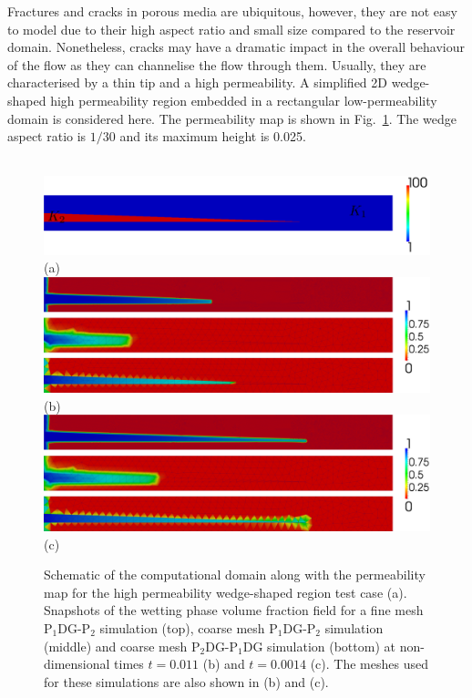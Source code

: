 \documentclass[times]{fldauth}
\newcommand{\PN}[2][error]{P$_{#1}$DG-P$_{#2}$}
\begin{document}
Fractures and cracks in porous media are ubiquitous, however, they are
not easy to model due to their high aspect ratio and small size
compared to the reservoir domain. Nonetheless, cracks may have a
dramatic impact in the overall behaviour of the flow as they can
channelise the flow through them. Usually, they are characterised by a
thin tip and a high permeability. A simplified 2D wedge-shaped
high permeability region embedded in a rectangular low-permeability
domain is considered here. The permeability map is shown in
Fig.~\ref{fig:wedge_permeability}. The wedge aspect ratio is $1/30$
and its maximum height is 0.025.

\begin{figure}[h!]
  \vbox{
    \hbox{
      \hspace{-0.cm}\includegraphics[width=1.0\textwidth]{wedge_permeabilityv2}}
    \vspace{-1.cm}\hbox{\hspace{4cm}(a)}
    \vspace{.5cm}
    \hbox{
      \hspace{-0.cm}\includegraphics[width=1.0\textwidth]{wedge_0011}}
    \vspace{-0.cm}\hbox{\hspace{4cm}(b)}
    \vspace{.5cm}
    \hbox{
      \hspace{-.cm}\includegraphics[width=1.0\textwidth]{wedge_0014}}
    \vspace{-0.cm}\hbox{\hspace{4cm}(c)}
  }
  \caption{Schematic of the computational domain along with the
    permeability map for the high permeability wedge-shaped region
    test case (a). Snapshots of the wetting phase volume fraction
    field for a fine mesh \PN[1]{2} simulation (top), coarse mesh
    \PN[1]{2} simulation (middle) and coarse mesh \PN[2]{1}DG
    simulation (bottom) at non-dimensional times $t = 0.011$ (b) and
    $t=0.0014$ (c). The meshes used for these simulations are also
    shown in (b) and (c).
    \label{fig:wedge_permeability}}
\end{figure}
\end{document}
